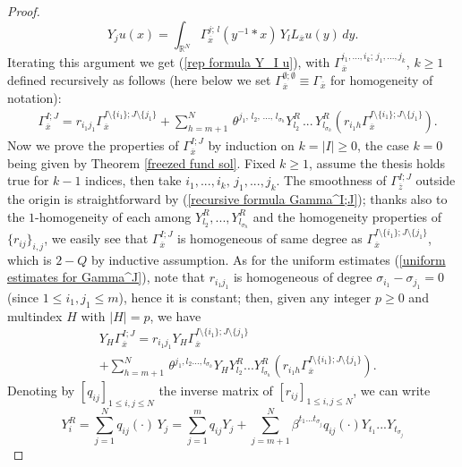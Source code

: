 \documentclass{article}
\numberwithin{equation}{section}
\begin{document}
\begin{proof}
\begin{equation}
    \label{new rep formula Y_j u (IPP)}
        Y_j u(x)=\int_{\mathbb{R}^N} \Gamma_{\overline{x}}^{j; \, l}(y^{-1} * x) \, Y_l L_{\overline{x}} u(y) \, dy.
    \end{equation}
    Iterating this argument we get (\ref{rep formula Y_I u}), with $\Gamma_{\overline{x}}^{i_1,...,i_k;\, j_1,...,j_k}$, $k \geq 1$ defined recursively as follows (here below we set $\Gamma_{\overline{x}}^{\emptyset;\emptyset} \equiv \Gamma_{\overline{x}}$ for homogeneity of notation):
    \begin{align}
        & \label{recursive formula Gamma^I;J} \Gamma_{\overline{x}}^{I; J} = r_{i_1 j_1} \Gamma_{\overline{x}}^{I \setminus \{i_1\}; J \setminus \{j_1\}} + \sum_{h=m+1}^N \, \theta^{j_1, \, l_2, \, ..., \, l_{\sigma_h}} Y_{l_2}^R \, ... \, Y_{l_{\sigma_h}}^R(r_{i_1 h} \Gamma_{\overline{x}}^{I \setminus \{i_1\}; J \setminus \{j_1\}}).
    \end{align}
    Now we prove the properties of $\Gamma_{\overline{x}}^{I;J}$ by induction on $k =|I| \geq 0$, the case $k=0$ being given by Theorem \ref{freezed fund sol}. Fixed $k \geq 1$, assume the thesis holds true for $k-1$ indices, then take $i_1,...,i_k, \, j_1,...,j_k$. The smoothness of $\Gamma_{\overline{z}}^{I;J}$ outside the origin is straightforward by (\ref{recursive formula Gamma^I;J}); thanks also to the $1$-homogeneity of each among $Y_{l_2}^R,...,Y_{l_{\sigma_h}}^R$ and the homogeneity properties of $\{r_{ij}\}_{i,j}$, we easily see that $\Gamma^{I;J}_{\overline{x}}$ is homogeneous of same degree as $\Gamma^{I\setminus \{i_1\}; J \setminus \{j_1\}}_{\overline{x}}$, which is $2-Q$ by inductive assumption.    
    As for the uniform estimates (\ref{uniform estimates for Gamma^J}), note that $r_{i_1 j_1}$ is homogeneous of degree $\sigma_{i_1}-\sigma_{j_1}=0$ (since $1 \leq i_1,j_1 \leq m$), hence it is constant; then, given any integer $p\geq 0$ and multindex $H$ with $|H|=p$, we have
    \begin{align*}
        & Y_{H} \Gamma_{\overline{x}}^{I;J} = r_{i_1 j_1} Y_{H} \Gamma_{\overline{x}}^{I \setminus \{i_1\}; J \setminus \{j_1\}}\\
        & +\sum_{h=m+1}^N \, \theta^{j_1,l_2...,l_{\sigma_h}} Y_{H} Y_{l_2}^R ... Y_{l_{\sigma_h}}^R(r_{i_1 h} \Gamma_{\overline{x}}^{I \setminus \{i_1\}; J \setminus \{j_1\}}).
    \end{align*}
    Denoting by $[q_{ij}]_{1 \leq i,j \leq N}$ the inverse matrix of $[r_{ij}]_{1 \leq i,j \leq N}$, we can write
    \begin{equation*}
        Y_i^R = \sum_{j=1}^N q_{ij}(\cdot) \, Y_j = \sum_{j=1}^m q_{ij} Y_j + \sum_{j=m+1}^N  \beta^{t_1...t_{\sigma_j}} q_{ij}(\cdot)Y_{t_1}...Y_{t_{\sigma_j}}

\end{equation*}
\end{proof}
\end{document}
